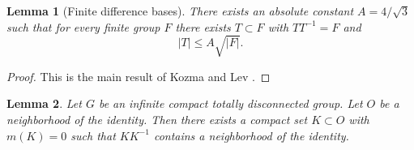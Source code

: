 \documentclass[12pt]{amsart}
\newtheorem{lemma}{Lemma}
\begin{document}
\begin{lemma}[Finite difference bases]
There exists an absolute constant \(A = 4/\sqrt{3}\) such that for every finite group \(F\)
there exists \(T \subset F\) with \(TT^{-1} = F\) and
\[
|T| \le A \sqrt{|F|}.
\]
\end{lemma}

\begin{proof}
This is the main result of Kozma and Lev \cite[Theorem~1]{KL}.
\end{proof}

\begin{lemma}
Let \(G\) be an infinite compact totally disconnected group.
Let \(O\) be a neighborhood of the identity.
Then there exists a compact set \(K \subset O\) with \(m(K)=0\)
such that \(KK^{-1}\) contains a neighborhood of the identity.
\end{lemma}
\end{document}
